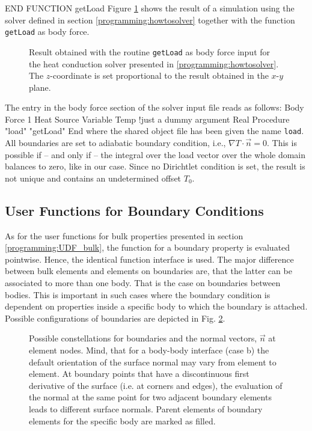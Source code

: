 END FUNCTION getLoad
\ttend
Figure \ref{fig:load} shows the result of a simulation using the solver defined in section \ref{programming:howtosolver} together with the function \texttt{getLoad} as body force.
\begin{figure}[tbhp]
\begin{center}
\caption{\label{fig:load} Result obtained with the routine \texttt{getLoad} as body force input for the heat conduction solver presented in \ref{programming:howtosolver}. The $z$-coordinate is set proportional to the result obtained in the $x$-$y$ plane.}
\end{center}
\end{figure}
The entry in the body force section of the solver input file reads as follows:
\ttbegin
Body Force 1
  Heat Source 
   Variable Temp      !just a dummy argument
   Real Procedure "load" "getLoad"
End
\ttend
where the shared object file has been given the name \texttt{load}. All boundaries are set to adiabatic boundary condition, i.e., $\nabla T\cdot\vec{n} = 0$. This is possible if -- and only if -- the integral over the load vector over the whole domain balances to zero, like in our case. Since no Dirichtlet condition is set, the result is not unique and contains an undetermined offset $T_{0}$. 
\subsection{User Functions for Boundary Conditions\label{programming:boundaryUDF}}
As for the user functions for bulk properties presented in section \ref{programming:UDF_bulk},  the function for a boundary property is evaluated pointwise. Hence, the identical function interface is used. The major difference between bulk elements and elements on boundaries are, that the latter can be associated to more than one body. That is the case on boundaries between bodies. This is important in such cases where the boundary condition is dependent on properties inside a specific body to which the boundary is attached. Possible configurations of boundaries are depicted in Fig. \ref{programming:fig:boundary}. 
\begin{figure}[tbhp]
\begin{center}
\caption{\label{programming:fig:boundary} Possible constellations for boundaries and the normal vectors, $\vec{n}$ at element nodes. Mind, that for a body-body interface (case b) the default orientation of the surface normal may vary from element to element. At boundary points that have a discontinuous first derivative of the surface (i.e. at corners and edges), the evaluation of the normal at the same point for two adjacent boundary elements leads to different surface normals. Parent elements of boundary elements for the specific body are marked as filled.}
\end{center}
\end{figure}

